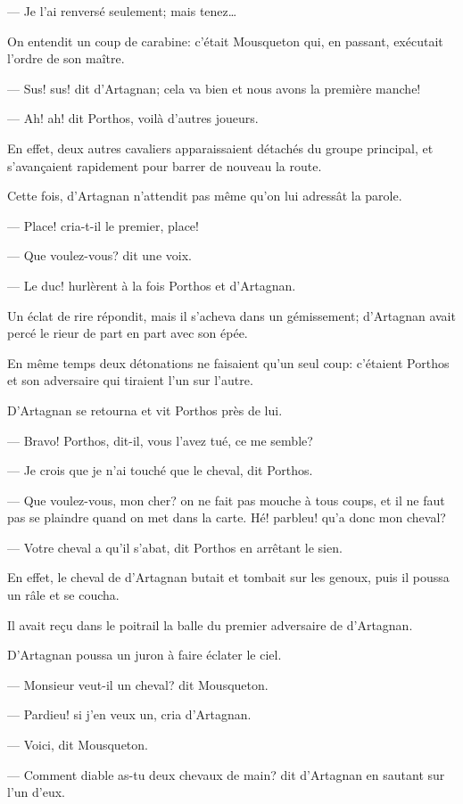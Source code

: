 — Je l'ai renversé seulement; mais tenez\dots

On entendit un coup de carabine: c'était Mousqueton qui, en passant, exécutait l'ordre de son maître.

— Sus! sus! dit d'Artagnan; cela va bien et nous avons la première manche!

— Ah! ah! dit Porthos, voilà d'autres joueurs.

En effet, deux autres cavaliers apparaissaient détachés du groupe principal, et s'avançaient rapidement pour barrer de nouveau la route.

Cette fois, d'Artagnan n'attendit pas même qu'on lui adressât la parole.

— Place! cria-t-il le premier, place!

— Que voulez-vous? dit une voix.

— Le duc! hurlèrent à la fois Porthos et d'Artagnan.

Un éclat de rire répondit, mais il s'acheva dans un gémissement; d'Artagnan avait percé le rieur de part en part avec son épée.

En même temps deux détonations ne faisaient qu'un seul coup: c'étaient Porthos et son adversaire qui tiraient l'un sur l'autre.

D'Artagnan se retourna et vit Porthos près de lui.

— Bravo! Porthos, dit-il, vous l'avez tué, ce me semble?

— Je crois que je n'ai touché que le cheval, dit Porthos.

— Que voulez-vous, mon cher? on ne fait pas mouche à tous coups, et il ne faut pas se plaindre quand on met dans la carte. Hé! parbleu! qu'a donc mon cheval?

— Votre cheval a qu'il s'abat, dit Porthos en arrêtant le sien.

En effet, le cheval de d'Artagnan butait et tombait sur les genoux, puis il poussa un râle et se coucha.

Il avait reçu dans le poitrail la balle du premier adversaire de d'Artagnan.

D'Artagnan poussa un juron à faire éclater le ciel.

— Monsieur veut-il un cheval? dit Mousqueton.

— Pardieu! si j'en veux un, cria d'Artagnan.

— Voici, dit Mousqueton.

— Comment diable as-tu deux chevaux de main? dit d'Artagnan en sautant sur l'un d'eux.

